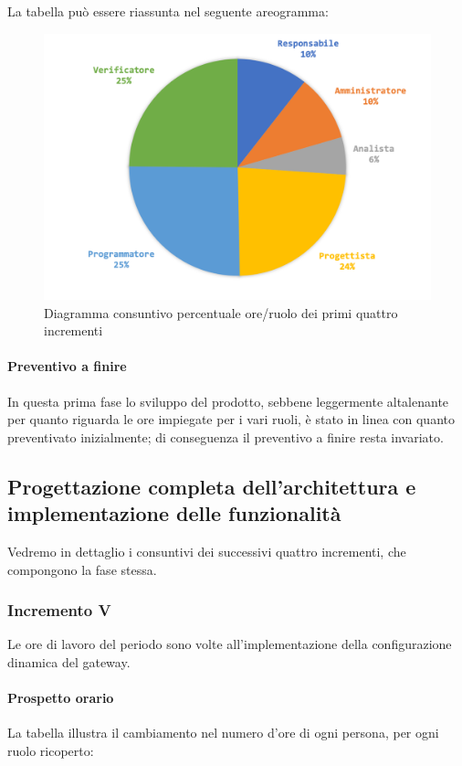 			La tabella può essere riassunta nel seguente areogramma:
			\begin{figure}[H]
				\centering
				\includegraphics[width=0.8\linewidth]{./images/consuntivo/ConsIncr1-4-2.png}
				\caption{Diagramma consuntivo percentuale ore/ruolo dei primi quattro incrementi}
				\label{fig:diagramma consuntivo costi ruolo incrementi I-IV}
			\end{figure}
		\paragraph{Preventivo a finire}
		In questa prima fase lo sviluppo del prodotto, sebbene leggermente altalenante per quanto riguarda le ore impiegate per i vari ruoli, è stato in linea con quanto preventivato inizialmente; di conseguenza il preventivo a finire resta invariato. 
		\pagebreak
		\subsection{Progettazione completa dell'architettura e implementazione delle funzionalità}
		Vedremo in dettaglio i consuntivi dei successivi quattro incrementi, che compongono la fase stessa.  
		\subsubsection{Incremento V }
		Le ore di lavoro del periodo sono volte all'implementazione della configurazione dinamica del gateway.
		\paragraph{Prospetto orario}
			La tabella illustra il cambiamento nel numero d'ore di ogni persona, per ogni ruolo ricoperto:
			
